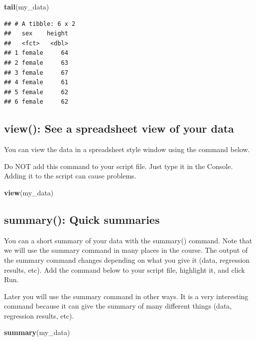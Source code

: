 \documentclass[
]{krantz}
\makeatletter
\newenvironment{Shaded}{\begin{snugshade}}{\end{snugshade}}
\newcommand{\KeywordTok}[1]{\textcolor[rgb]{0.27,0.27,0.27}{\textbf{#1}}}
\newcommand{\NormalTok}[1]{#1}
\newenvironment{kframe}{%
\medskip{}
\setlength{\fboxsep}{.8em}
 \def\at@end@of@kframe{}%
 \ifinner\ifhmode%
  \def\at@end@of@kframe{\end{minipage}}%
  \begin{minipage}{\columnwidth}%
 \fi\fi%
 \def\FrameCommand##1{\hskip\@totalleftmargin \hskip-\fboxsep
 \colorbox{shadecolor}{##1}\hskip-\fboxsep
     \hskip-\linewidth \hskip-\@totalleftmargin \hskip\columnwidth}%
 \MakeFramed {\advance\hsize-\width
   \@totalleftmargin\z@ \linewidth\hsize
   \@setminipage}}%
 {\par\unskip\endMakeFramed%
 \at@end@of@kframe}
\renewenvironment{Shaded}{\begin{kframe}}{\end{kframe}}
\makeatother
\begin{document}
\begin{Shaded}
\begin{Highlighting}[]
\KeywordTok{tail}\NormalTok{(my_data)}
\end{Highlighting}
\end{Shaded}

\begin{verbatim}
## # A tibble: 6 x 2
##   sex    height
##   <fct>   <dbl>
## 1 female     64
## 2 female     63
## 3 female     67
## 4 female     61
## 5 female     62
## 6 female     62
\end{verbatim}

\hypertarget{view-see-a-spreadsheet-view-of-your-data}{%
\subsection{view(): See a spreadsheet view of your data}\label{view-see-a-spreadsheet-view-of-your-data}}

You can view the data in a spreadsheet style window using the command below.

Do NOT add this command to your script file. Just type it in the Console. Adding it to the script can cause problems.

\begin{Shaded}
\begin{Highlighting}[]
\KeywordTok{view}\NormalTok{(my_data)}
\end{Highlighting}
\end{Shaded}

\hypertarget{summary-quick-summaries}{%
\subsection{summary(): Quick summaries}\label{summary-quick-summaries}}

You can a short summary of your data with the summary() command. Note that we will use the summary command in many places in the course. The output of the summary command changes depending on what you give it (data, regression results, etc). Add the command below to your script file, highlight it, and click Run.

Later you will use the summary command in other ways. It is a very interesting command because it can give the summary of many different things (data, regression results, etc).

\begin{Shaded}
\begin{Highlighting}[]
\KeywordTok{summary}\NormalTok{(my_data)}
\end{Highlighting}
\end{Shaded}
\end{document}
